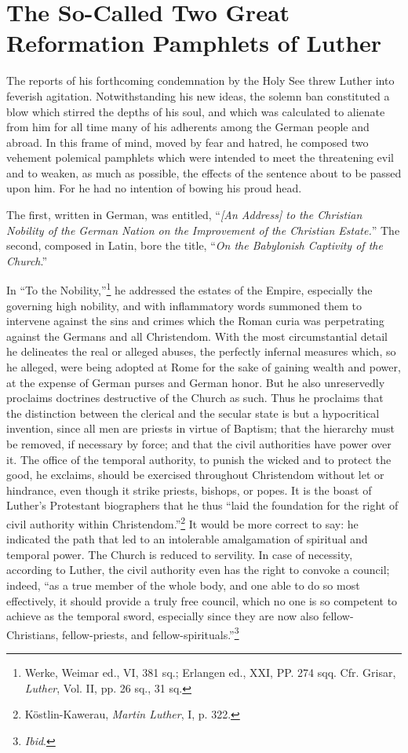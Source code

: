 \section{The So-Called Two Great Reformation Pamphlets of Luther}

The reports of his forthcoming condemnation by the Holy See
threw Luther into feverish agitation. Notwithstanding his new ideas,
the solemn ban constituted a blow which stirred the depths of his
soul, and which was calculated to alienate from him for all time
many of his adherents among the German people and abroad. In this
frame of mind, moved by fear and hatred, he composed two vehement
polemical pamphlets which were intended to meet the threatening
evil and to weaken, as much as possible, the effects of the sentence
about to be passed upon him. For he had no intention of bowing his
proud head.

The first, written in German, was entitled, ``\textit{[An Address] to
the Christian Nobility of the German Nation on the Improvement
of the Christian Estate.}” The second, composed in Latin, bore the
title, “\textit{On the Babylonish Captivity of the Church}.''

In “To the Nobility,”\footnote
{Werke, Weimar ed., VI, 381 sq.; Erlangen ed., XXI, PP. 274 sqq. Cfr. Grisar, \textit{Luther},
Vol. II, pp. 26 sq., 31 sq.}
he addressed the estates of the Empire,
especially the governing high nobility, and with inflammatory words
summoned them to intervene against the sins and crimes which the
Roman curia was perpetrating against the Germans and all Christendom.
With the most circumstantial detail he delineates the real or
alleged abuses, the perfectly infernal measures which, so he alleged,
were being adopted at Rome for the sake of gaining wealth and
power, at the expense of German purses and German honor. But he
also unreservedly proclaims doctrines destructive of the Church as
such. Thus he proclaims that the distinction between the clerical and
the secular state is but a hypocritical invention, since all men are
priests in virtue of Baptism; that the hierarchy must be removed, if
necessary by force; and that the civil authorities have power over it.
The office of the temporal authority, to punish the wicked and to protect
the good, he exclaims, should be exercised throughout Christendom
without let or hindrance, even though it strike priests, bishops,
or popes. It is the boast of Luther’s Protestant biographers that he
thus “laid the foundation for the right of civil authority within
Christendom.”\footnote{Köstlin-Kawerau, \textit{Martin Luther}, I, p. 322.}
It would be more correct to say: he indicated the
path that led to an intolerable amalgamation of spiritual and temporal
power. The Church is reduced to servility. In case of necessity, according
to Luther, the civil authority even has the right to convoke a
council; indeed, “as a true member of the whole body, and one able
to do so most effectively, it should provide a truly free council, which
no one is so competent to achieve as the temporal sword, especially
since they are now also fellow-Christians, fellow-priests, and fellow-spirituals.”\footnote{\textit{Ibid}.}

